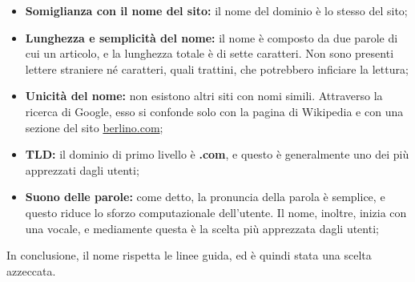 \begin{itemize}
\item \textbf{Somiglianza con il nome del sito:} il nome del dominio è lo stesso del sito;
\item \textbf{Lunghezza e semplicità del nome:} il nome è composto da due parole di cui un articolo, e la lunghezza totale è di sette caratteri. Non sono presenti lettere straniere né caratteri, quali trattini, che potrebbero inficiare la lettura;
\item \textbf{Unicità del nome:} non esistono altri siti con nomi simili. Attraverso la ricerca di Google, esso si confonde solo con la pagina di Wikipedia e con una sezione del sito \href{http://www.berlino.com}{berlino.com};
\item \textbf{TLD:} il dominio di primo livello è \textbf{.com}, e questo è generalmente uno dei più apprezzati dagli utenti;
\item \textbf{Suono delle parole:} come detto, la pronuncia della parola è semplice, e questo riduce lo sforzo computazionale dell'utente. Il nome, inoltre, inizia con una vocale, e mediamente questa è la scelta più apprezzata dagli utenti;
\end{itemize}
In conclusione, il nome rispetta le linee guida, ed è quindi stata una scelta azzeccata.